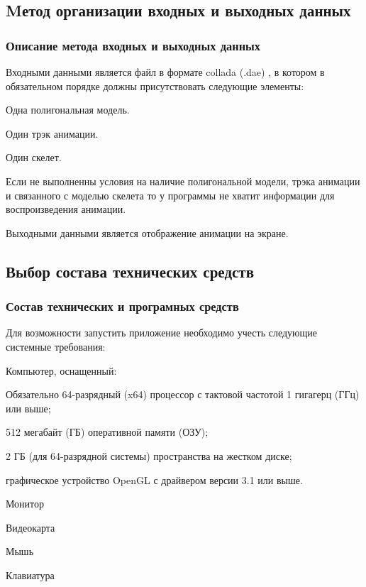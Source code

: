 \subsection{Mетод организации входных и выходных данных}

\subsubsection{Описание метода входных и выходных данных}
Входными данными является файл в формате collada (.dae)
, в котором в обязательном порядке должны присутствовать следующие элементы:
\begin{my_enumerate}
\item Одна полигональная модель.
\item Один трэк анимации.
\item Один скелет.
\end{my_enumerate}

Если не выполненны условия на наличие полигональной модели,
трэка анимации и связанного с моделью скелета то
у программы не хватит информации для воспроизведения анимации.

Выходными данными является отображение анимации на экране.


\subsection{Выбор состава технических средств}

\subsubsection{Состав технических и програмных средств}
Для возможности запустить приложение необходимо учесть следующие системные требования:
\begin{my_enumerate}
\item Компьютер, оснащенный:
    \begin{my_enumerate}
    \item Обязательно 64-разрядный (x64) процессор с тактовой частотой 1 гигагерц (ГГц) или выше;
    \item 512 мегабайт (ГБ) оперативной памяти (ОЗУ);
    \item 2 ГБ (для 64-разрядной системы) пространства на жестком диске;
    \item графическое устройство OpenGL с драйвером версии 3.1 или выше.
    \end{my_enumerate}
\item Монитор
\item Видеокарта
\item Мышь
\item Клавиатура
\end{my_enumerate}

